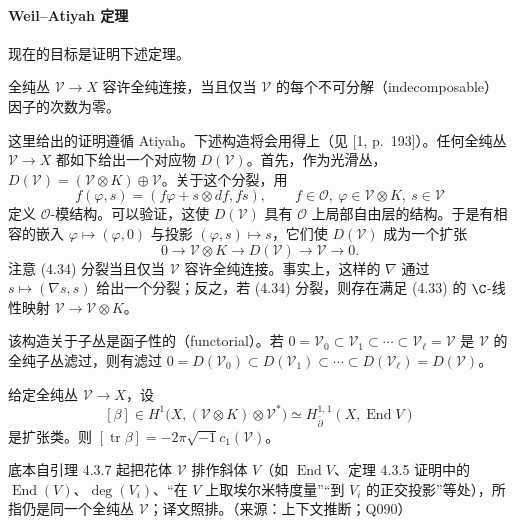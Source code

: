 \paragraph{Weil--Atiyah 定理}
现在的目标是证明下述定理。

\begin{theorem}
全纯丛 $\mathcal{V}\to X$ 容许全纯连接，当且仅当 $\mathcal{V}$ 的每个不可分解（indecomposable）因子的次数为零。
\end{theorem}

这里给出的证明遵循 Atiyah。下述构造将会用得上（见 [1, p.\ 193]）。任何全纯丛 $\mathcal{V}\to X$ 都如下给出一个对应物 $D(\mathcal{V})$。首先，作为光滑丛，$D(\mathcal{V})=(\mathcal{V}\otimes K)\oplus\mathcal{V}$。关于这个分裂，用
\[
f(\varphi,s)=(f\varphi+s\otimes df,fs),\qquad f\in\mathcal{O},\ \varphi\in\mathcal{V}\otimes K,\ s\in\mathcal{V}
\]
定义 $\mathcal{O}$-模结构。可以验证，这使 $D(\mathcal{V})$ 具有 $\mathcal{O}$ 上局部自由层的结构。于是有相容的嵌入 $\varphi\mapsto(\varphi,0)$ 与投影 $(\varphi,s)\mapsto s$，它们使 $D(\mathcal{V})$ 成为一个扩张
\begin{equation}
0\longrightarrow\mathcal{V}\otimes K\longrightarrow D(\mathcal{V})\longrightarrow\mathcal{V}\longrightarrow 0.
\label{eq:4.34}\tag{4.34}
\end{equation}
注意 (4.34) 分裂当且仅当 $\mathcal{V}$ 容许全纯连接。事实上，这样的 $\nabla$ 通过 $s\mapsto(\nabla s,s)$ 给出一个分裂；反之，若 (4.34) 分裂，则存在满足 (4.33) 的 $\C$-线性映射 $\mathcal{V}\to\mathcal{V}\otimes K$。

\begin{remark}
该构造关于子丛是函子性的（functorial）。若 $0=\mathcal{V}_0\subset\mathcal{V}_1\subset\cdots\subset\mathcal{V}_\ell=\mathcal{V}$ 是 $\mathcal{V}$ 的全纯子丛滤过，则有滤过 $0=D(\mathcal{V}_0)\subset D(\mathcal{V}_1)\subset\cdots\subset D(\mathcal{V}_\ell)=D(\mathcal{V})$。
\end{remark}

\begin{lemma}
给定全纯丛 $\mathcal{V}\to X$，设
\[
[\beta]\in H^1\bigl(X,(\mathcal{V}\otimes K)\otimes\mathcal{V}^*\bigr)
\simeq H^{1,1}_{\bar\partial}(X,\operatorname{End}V)
\]
是扩张类。则 $[\operatorname{tr}\beta]=-2\pi\sqrt{-1}c_1(\mathcal{V})$。
\end{lemma}
\begin{annote}
底本自引理 4.3.7 起把花体 $\mathcal{V}$ 排作斜体 $V$（如 $\operatorname{End}V$、定理 4.3.5 证明中的 $\operatorname{End}(V)$、$\deg(V_i)$、“在 $V$ 上取埃尔米特度量”“到 $V_i$ 的正交投影”等处），所指仍是同一个全纯丛 $\mathcal{V}$；译文照排。（来源：上下文推断；Q090）
\end{annote}

